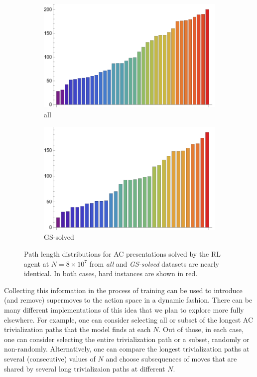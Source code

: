 \begin{figure}[h]
    \centering
    \begin{subfigure}{0.45\textwidth}
        \centering
        \includegraphics[width=\textwidth]{fig/all_path_length_80M.png}
        \caption{all}
        \label{fig:all_path_length_80M}
    \end{subfigure}
    \hfill
    \begin{subfigure}{0.45\textwidth}
        \centering
        \includegraphics[width=\textwidth]{fig/solved_path_length_80M.png}
        \caption{GS-solved}
        \label{fig:solved_path_length_80M}
    \end{subfigure}
    \caption{Path length distributions for AC presentations solved by the RL agent at $N=8 \times 10^7$ from \textit{all} and \textit{GS-solved} datasets are nearly identical. In both cases, hard instances are shown in red.}
    \label{fig:path_length_80M}
\end{figure}

Collecting this information in the process of training can be used to introduce (and remove) supermoves to the action space in a dynamic fashion. There can be many different implementations of this idea that we plan to explore more fully elsewhere. For example, one can consider selecting all or subset of the longest AC trivialization paths that the model finds at each $N$. Out of those, in each case, one can consider selecting the entire trivialization path or a subset, randomly or non-randomly. Alternatively, one can compare the longest trivialization paths at several (consecutive) values of $N$ and choose subsequences of moves that are shared by several long trivializaion paths at different $N$.

